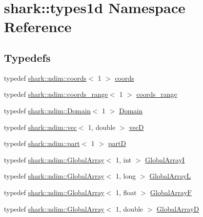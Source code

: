 \hypertarget{namespaceshark_1_1types1d}{}\section{shark\+:\+:types1d Namespace Reference}
\label{namespaceshark_1_1types1d}
\subsection*{Typedefs}
\begin{DoxyCompactItemize}
\item 
typedef \hyperlink{structshark_1_1ndim_1_1coords}{shark\+::ndim\+::coords}$<$ 1 $>$ \hyperlink{namespaceshark_1_1types1d_a41447c69d155fbe67345673292846aff}{coords}
\item 
typedef \hyperlink{structshark_1_1ndim_1_1coords__range}{shark\+::ndim\+::coords\+\_\+range}$<$ 1 $>$ \hyperlink{namespaceshark_1_1types1d_a86c482888835159e049d3464ca5b244e}{coords\+\_\+range}
\item 
typedef \hyperlink{classshark_1_1ndim_1_1_domain}{shark\+::ndim\+::\+Domain}$<$ 1 $>$ \hyperlink{namespaceshark_1_1types1d_a1c8bb3eeae3e12c881ef141e0458cb6e}{Domain}
\item 
typedef \hyperlink{structshark_1_1ndim_1_1vec}{shark\+::ndim\+::vec}$<$ 1, double $>$ \hyperlink{namespaceshark_1_1types1d_a96b222de82755e7cdf915ca4652abb00}{vecD}
\item 
typedef \hyperlink{structshark_1_1ndim_1_1part}{shark\+::ndim\+::part}$<$ 1 $>$ \hyperlink{namespaceshark_1_1types1d_a46775e0f758bf283c37ef3733ac9e294}{partD}
\item 
typedef \hyperlink{classshark_1_1ndim_1_1_global_array}{shark\+::ndim\+::\+Global\+Array}$<$ 1, int $>$ \hyperlink{namespaceshark_1_1types1d_a458fc07a86392a11eff6b5c1bf5b7e5d}{Global\+ArrayI}
\item 
typedef \hyperlink{classshark_1_1ndim_1_1_global_array}{shark\+::ndim\+::\+Global\+Array}$<$ 1, long $>$ \hyperlink{namespaceshark_1_1types1d_a046807c9a181ac7344006937697a5ad5}{Global\+ArrayL}
\item 
typedef \hyperlink{classshark_1_1ndim_1_1_global_array}{shark\+::ndim\+::\+Global\+Array}$<$ 1, float $>$ \hyperlink{namespaceshark_1_1types1d_a25c5c8fb6e2c34b710bfcb578f61b8ac}{Global\+ArrayF}
\item 
typedef \hyperlink{classshark_1_1ndim_1_1_global_array}{shark\+::ndim\+::\+Global\+Array}$<$ 1, double $>$ \hyperlink{namespaceshark_1_1types1d_af0b4fbd404532626bd95fff52b0be385}{Global\+ArrayD}

\end{DoxyCompactItemize}
